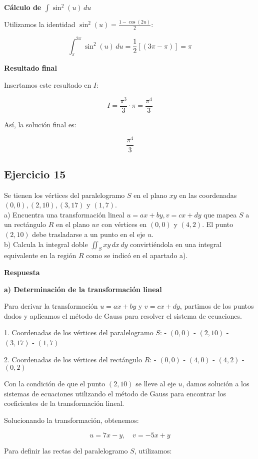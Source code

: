 \documentclass{report}
\begin{document}
\textbf{Cálculo de \(\int \sin^2(u) \, du\)}

Utilizamos la identidad \(\sin^2(u) = \frac{1 - \cos(2u)}{2}\):

\[
\int_{\pi}^{3\pi} \sin^2(u) \, du = \frac{1}{2} \left[ (3\pi - \pi) \right] = \pi
\]

\textbf{Resultado final}

Insertamos este resultado en \(I\):

\[
I = \frac{\pi^3}{3} \cdot \pi = \frac{\pi^4}{3}
\]

Así, la solución final es:

\[
\boxed{\frac{\pi^4}{3}}
\]\subsection{Ejercicio 15}
Se tienen los vértices del paralelogramo $S$ en el plano $xy$ en las coordenadas $(0,0),(2,10),(3,17)$ y $(1,7)$.\\
a) Encuentra una transformación lineal $u=ax+by, v=cx+dy$ que mapea $S$ a un rectángulo $R$ en el plano $uv$ con vértices en $(0,0)$ y $(4,2)$. El punto $(2,10)$ debe trasladarse a un punto en el eje $u$.\\
b) Calcula la integral doble $\iint_{S} x y \, dx \, dy$ convirtiéndola en una integral equivalente en la región $R$ como se indicó en el apartado a).

\textbf{Respuesta}

\vspace{10pt}
\textbf{a) Determinación de la transformación lineal}

Para derivar la transformación \(u = ax + by\) y \(v = cx + dy\), partimos de los puntos dados y aplicamos el método de Gauss para resolver el sistema de ecuaciones.

1. Coordenadas de los vértices del paralelogramo \(S\):
   - \((0, 0)\)
   - \((2, 10)\)
   - \((3, 17)\)
   - \((1, 7)\)

2. Coordenadas de los vértices del rectángulo \(R\):
   - \((0, 0)\)
   - \((4, 0)\)
   - \((4, 2)\)
   - \((0, 2)\)

Con la condición de que el punto \((2, 10)\) se lleve al eje \(u\), damos solución a los sistemas de ecuaciones utilizando el método de Gauss para encontrar los coeficientes de la transformación lineal.

Solucionando la transformación, obtenemos:

\[
u = 7x - y, \quad v = -5x + y
\]

Para definir las rectas del paralelogramo \(S\), utilizamos:
\end{document}
